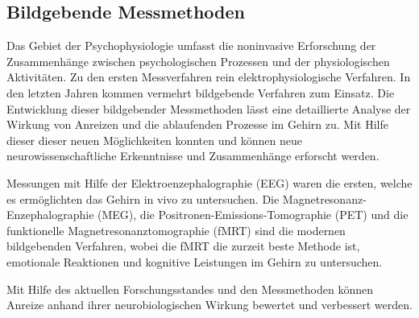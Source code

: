 \subsection{Bildgebende Messmethoden}
Das Gebiet der Psychophysiologie umfasst die noninvasive Erforschung der Zusammenhänge zwischen psychologischen Prozessen und der physiologischen Aktivitäten. Zu den ersten Messverfahren rein elektrophysiologische Verfahren. In den letzten Jahren kommen vermehrt bildgebende Verfahren zum Einsatz. \citep[S. 232]{Kirschbaum.2008}
Die Entwicklung dieser bildgebender Messmethoden lässt eine detaillierte Analyse der Wirkung von Anreizen und die ablaufenden Prozesse im Gehirn  zu. Mit Hilfe dieser dieser neuen Möglichkeiten konnten und können neue neurowissenschaftliche Erkenntnisse und Zusammenhänge erforscht werden. \citep[S. 15]{Nowka.2013}
 
Messungen mit Hilfe der Elektroenzephalographie (EEG) waren die ersten, welche es ermöglichten das Gehirn in vivo zu untersuchen. \citep[S. 43]{Weber.2011}  Die Magnetresonanz-Enzephalographie (MEG), die Positronen-Emissions-Tomographie (PET)  und die funktionelle Magnetresonanztomographie (fMRT) sind die modernen bildgebenden Verfahren, wobei die fMRT die zurzeit beste Methode ist, emotionale Reaktionen und kognitive Leistungen im Gehirn zu untersuchen. \citep[S. 50]{Weber.2011}
 
Mit Hilfe des aktuellen Forschungsstandes und den \glqq Messmethoden können Anreize anhand ihrer neurobiologischen Wirkung bewertet und verbessert werden.\grqq \citep[S. 17]{Nowka.2013}
\newpage